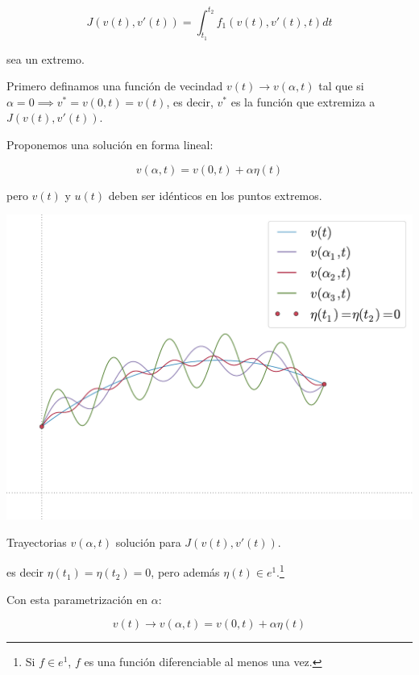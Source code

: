         \begin{equation} \label{eq:opfun1}
            J(v(t), v'(t)) = \int_{t_1}^{t_2} f_1(v(t), v'(t), t) dt
        \end{equation}

        sea un extremo.

        Primero definamos una función de vecindad $v(t) \to v(\alpha, t)$ tal que si $\alpha = 0 \implies v^* = v(0, t) = v(t)$, es decir, $v^*$ es la función que extremiza a $J(v(t), v'(t))$.

        Proponemos una solución en forma lineal:

        \begin{equation}
            v(\alpha, t) = v(0, t) + \alpha \eta(t)
        \end{equation}

        pero $v(t)$ y $u(t)$ deben ser idénticos en los puntos extremos.

        \begin{marginfigure}
            \centering
            \includegraphics[width=\textwidth]{./imagenes/trayectorias.pdf}
            \caption{\label{fig:trayectorias}Trayectorias $v(\alpha, t)$ solución para $J(v(t), v'(t))$.}
        \end{marginfigure}

        es decir $\eta(t_1) = \eta(t_2) = 0$, pero además $\eta(t) \in e^1$.\footnote{Si $f \in e^1$, $f$ es una función diferenciable al menos una vez.}

        Con esta parametrización en $\alpha$:

        \begin{equation*}
            v(t) \to v(\alpha, t) = v(0, t) + \alpha \eta(t)
        \end{equation*}

